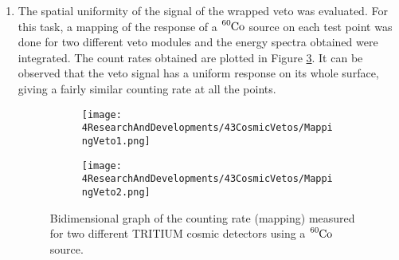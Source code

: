 \begin{enumerate}
\item{} The spatial uniformity of the signal of the wrapped veto was evaluated. For this task, a mapping of the response of a $\ce{^{60}Co}$ source on each test point was done for two different veto modules and the energy spectra obtained were integrated. The count rates obtained are plotted in Figure \ref{fig:MappingVetos}. It can be observed that the veto signal has a uniform response on its whole surface, giving a fairly similar counting rate at all the points.
\begin{figure}
\centering
    \begin{subfigure}[b]{0.9\textwidth}
    \centering
    \texttt{[image: 4ResearchAndDevelopments/43CosmicVetos/MappingVeto1.png]}  
    \caption{\label{subfig:MappingVeto1}}
    \end{subfigure}
    \hfill
    \begin{subfigure}[b]{0.9\textwidth}
    \centering
    \texttt{[image: 4ResearchAndDevelopments/43CosmicVetos/MappingVeto2.png]}  
    \caption{\label{subfig:MappingVeto2}}
    \end{subfigure}
 \caption{Bidimensional graph of the counting rate (mapping) measured for two different TRITIUM cosmic detectors using a $\ce{^{60}Co}$ source.}
 \label{fig:MappingVetos}
\end{figure}
\end{enumerate}

